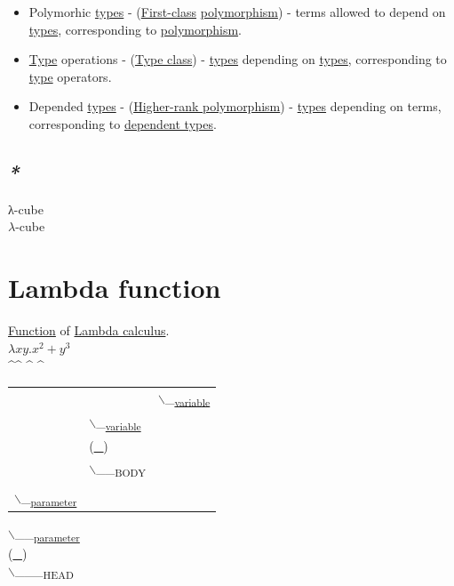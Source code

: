 \documentclass[a4paper,14pt,oneside]{book}
\begin{document}
\begin{itemize}
\item Polymorhic \hyperref[orgc040995]{types} - (\hyperref[org05b4478]{First-class} \hyperref[org958c487]{polymorphism}) - terms allowed to depend on \hyperref[orgc040995]{types}, corresponding to \hyperref[org958c487]{polymorphism}.\\
\item \hyperref[org9688b4c]{Type} operations - (\hyperref[org4987976]{Type class}) - \hyperref[orgc040995]{types} depending on \hyperref[orgc040995]{types}, corresponding to \hyperref[org9688b4c]{type} operators.\\
\item Depended \hyperref[orgc040995]{types} - (\hyperref[org5732a30]{Higher-rank polymorphism}) - \hyperref[orgc040995]{types} depending on terms, corresponding to \hyperref[org7b4a967]{dependent types}.\\
\end{itemize}

\subsection{\emph{*}}
\label{sec:org79202ed}

\label{org8045348}λ-cube\\
\label{orge354e2e}\(\lambda\)-cube\\

\section{\label{org1c24a11}Lambda function}
\label{sec:org43717c9}
\hyperref[org31e09d0]{Function} of \hyperref[orgddd0b5e]{Lambda calculus}.\\
\(\lambda x y.x^2 + y^3\)\\
 \^{}\^{} \^{}    \^{}\\
\begin{center}
\begin{tabular}{lll}
 &  & $\backslash$_\textsubscript{\hyperref[org402e161]{variable}}\\
 & $\backslash$_\textsubscript{\hyperref[org402e161]{variable}}\\
 & (\uline{\uline{\_}})\\
 & $\backslash$_\_\textsubscript{BODY}\\
\\
$\backslash$_\textsubscript{\hyperref[org5097181]{parameter}}\\
\end{tabular}
\end{center}
  $\backslash$_\_\textsubscript{\hyperref[org5097181]{parameter}}\\
(\uline{\_})\\
   $\backslash$_\_\_\textsubscript{HEAD}\\
\end{document}
